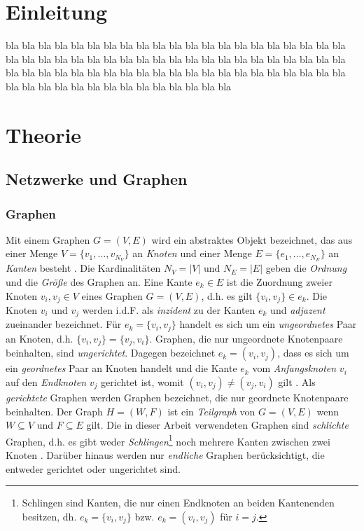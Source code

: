 \documentclass[12pt, a4paper]{report}
\let\abk\nomenclature
\begin{document}
\tableofcontents

\listoffigures

\listoftables

\printnomenclature 

\abk{GWAS}{Genome-wide association study}



\chapter{Einleitung}
bla bla bla bla bla bla bla bla bla bla bla bla bla bla bla bla bla bla bla bla bla bla bla bla bla bla bla bla bla bla bla bla bla bla bla bla bla bla bla bla bla bla bla bla bla bla bla bla bla bla bla bla bla bla bla bla bla bla bla bla bla bla bla bla bla bla bla bla bla bla bla bla bla bla bla bla bla \cite{kim_network-based_2013}




\chapter{Theorie}
\section{Netzwerke und Graphen}
\subsection{Graphen}
Mit einem Graphen $G=(V,E)$ wird ein abstraktes Objekt bezeichnet, das aus einer Menge $V=\{v_1,\dots,v_{N_V}\}$ an \textit{Knoten} und einer Menge $E=\{e_1,\dots,e_{N_E}\}$ an \textit{Kanten} besteht \cite{brandes2005graphfunda}. Die Kardinalitäten $N_V =|V|$ und $N_E=|E|$ geben die \textit{Ordnung} und die \textit{Größe} des Graphen an. Eine Kante $e_k \in E$ ist die Zuordnung zweier Knoten $v_i,v_j \in V$ eines Graphen $G=(V,E)$, d.h. es gilt $\{v_i,v_j\} \in e_k$. Die Knoten $v_i$ und $v_j$ werden \mbox{i.d.F.} als \textit{inzident} zu der Kanten $e_k$ und \textit{adjazent} zueinander bezeichnet. Für $e_k=\{v_i,v_j\}$ handelt es sich um ein \textit{ungeordnetes} Paar an Knoten, d.h. $\{v_i,v_j\}=\{v_j,v_i\}$. Graphen, die nur ungeordnete Knotenpaare beinhalten, sind \textit{ungerichtet}. Dagegen bezeichnet $e_k=(v_i,v_j)$, dass es sich um ein \textit{geordnetes} Paar an Knoten handelt und die Kante $e_k$ vom \textit{Anfangsknoten} $v_i$ auf den \textit{Endknoten} $v_j$ gerichtet ist, womit $(v_i,v_j) \neq (v_j, v_i)$ gilt \cite{kolaczyk2009statistical}. Als \textit{gerichtete} Graphen werden Graphen bezeichnet, die nur geordnete Knotenpaare beinhalten. Der Graph $H=(W,F)$ ist ein \textit{Teilgraph} von $G=(V,E)$ wenn $W \subseteq V$ und $F \subseteq E$ gilt. Die in dieser Arbeit verwendeten Graphen sind \textit{schlichte} Graphen, d.h. es gibt weder \textit{Schlingen}\footnote{ Schlingen sind Kanten, die nur einen Endknoten an beiden Kantenenden besitzen, dh. $e_k=\{v_i,v_j\}$ bzw. $e_k=(v_i,v_j)$ für $i=j$.} noch mehrere Kanten zwischen zwei Knoten \cite{tittmann2011graphen}. Darüber hinaus werden nur \textit{endliche} Graphen berücksichtigt, die entweder gerichtet oder ungerichtet sind.\\
\end{document}
